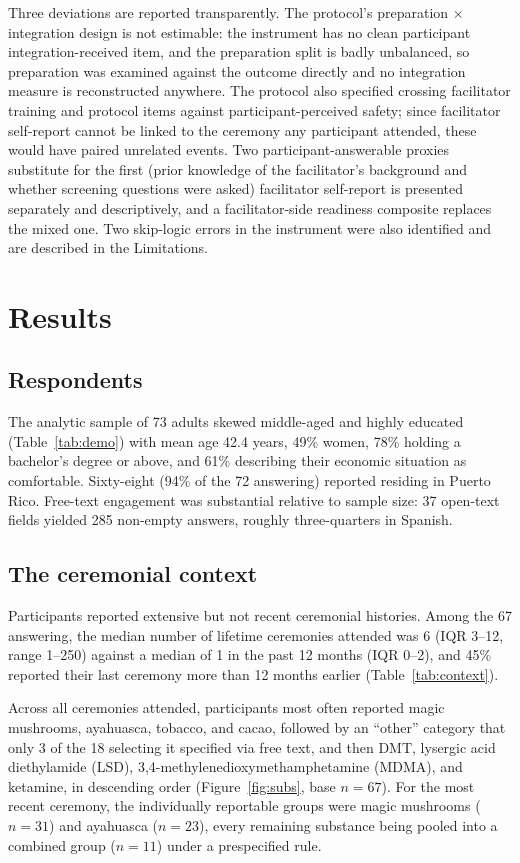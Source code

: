 \documentclass[12pt]{article}
\begin{document}
Three deviations are reported transparently. The protocol's preparation $\times$ integration design
is not estimable: the instrument has no clean participant integration-received item, and the preparation
split is badly unbalanced, so preparation was examined against the outcome directly and no integration
measure is reconstructed anywhere. The protocol also specified crossing facilitator training and protocol
items against participant-perceived safety; since facilitator self-report cannot be linked to the ceremony
any participant attended, these would have paired unrelated events. Two participant-answerable proxies
substitute for the first (prior knowledge of the facilitator's background and whether screening questions
were asked) facilitator self-report is presented separately and descriptively, and a facilitator-side
readiness composite replaces the mixed one. Two skip-logic errors in the instrument were also identified
and are described in the Limitations.

\section{Results}

\subsection{Respondents}

The analytic sample of 73 adults skewed middle-aged and highly educated (Table~\ref{tab:demo}) with mean age
42.4 years, 49\% women, 78\% holding a bachelor's degree or above, and 61\% describing their economic
situation as comfortable. Sixty-eight (94\% of the 72 answering) reported residing in Puerto Rico. Free-text
engagement was substantial relative to sample size: 37 open-text fields yielded 285 non-empty answers,
roughly three-quarters in Spanish.

\subsection{The ceremonial context}

Participants reported extensive but not recent ceremonial histories. Among the 67 answering, the median
number of lifetime ceremonies attended was 6 (IQR 3--12, range 1--250) against a median of 1 in the past 12
months (IQR 0--2), and 45\% reported their last ceremony more than 12 months earlier
(Table~\ref{tab:context}).

Across all ceremonies attended, participants most often reported magic mushrooms, ayahuasca, tobacco, and
cacao, followed by an ``other'' category that only 3 of the 18 selecting it specified via free text, and
then DMT, lysergic acid diethylamide (LSD), 3,4-methylenedioxymethamphetamine (MDMA), and ketamine, in
descending order (Figure~\ref{fig:subs}, base $n=67$). For the most
recent ceremony, the individually reportable groups were magic mushrooms ($n=31$) and ayahuasca ($n=23$),
every remaining substance being pooled into a combined group ($n=11$) under a prespecified rule.
\end{document}
